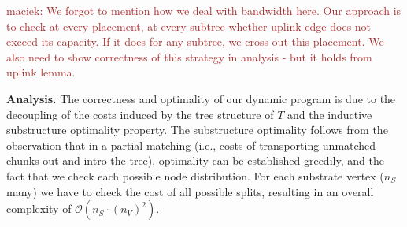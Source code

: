 \documentclass[9pt]{sigcomm-alternate}
\newcommand{\maciek}[1]{\textcolor{brown}{maciek: #1}}
\newcommand{\SubstrateNodes}{\ensuremath{V_S}}
\newcommand{\SubstrateNode}{\ensuremath{v}}
\newcommand{\Opt}{\ensuremath{Opt}}
\newcommand{\Uplink}{\ensuremath{\textsc{uplink}}}
\newcommand{\ChunkCount}{\ensuremath{\textsc{cis}}}
\newcommand{\capacity}{\emph{cap}}
\newcommand{\Tree}{\ensuremath{T}}
\newcommand{\CostTrans}{\ensuremath{b_1}}
\newcommand{\CostCom}{\ensuremath{b_2}}
\newcommand{\Vms}{\ensuremath{n_V}}
\begin{document}
\maciek{We forgot to mention how we deal with bandwidth here. Our
  approach is to check at every placement, at every subtree whether
  uplink edge does not exceed its capacity. If it does for any subtree, we cross out
  this placement. We also need to show correctness of this strategy in
  analysis - but it holds from uplink lemma.}

\textbf{Analysis.}
The correctness and optimality of our dynamic program 
is due to the decoupling of the costs induced by the tree
structure of $\Tree$ and the inductive substructure
optimality property. 
The substructure optimality follows from the observation that 
in a partial matching (i.e., costs of transporting unmatched
chunks out and intro the tree), 
optimality can be established greedily, and the fact
 that we check each possible node distribution. 
For each substrate vertex ($n_S$ many) we have 
to check the cost of all possible splits, 
resulting in an overall complexity of $\mathcal{O}(n_S \cdot (n_V)^2)$.
\end{document}
